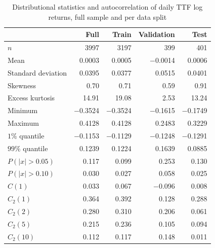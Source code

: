 \begin{table}[H]
\centering
\begin{tabular}{lrrrr}
\toprule
 & Full & Train & Validation & Test \\
\midrule
$n$                    & \num{3997}  & \num{3197}  & \num{399}      & \num{401}    \\
Mean                   &  \num{0.0003}  &  \num{0.0005}  & \num{-0.0014} &  \num{0.0006}  \\
Standard deviation     &  \num{0.0395}  &  \num{0.0377}  &  \num{0.0515}  &  \num{0.0401}  \\
Skewness               &  \num{0.70}    &  \num{0.71}    &  \num{0.59}    &  \num{0.91}    \\
Excess kurtosis        &  \num{14.91}    &  \num{19.08}    &  \num{2.53}    &  \num{13.24}    \\
Minimum                &  \num{-0.3524} &  \num{-0.3524} &  \num{-0.1615} &  \num{-0.1749} \\
Maximum                &  \num{0.4128}  &  \num{0.4128}  &  \num{0.2483}  &  \num{0.3229}  \\
$1\%$ quantile         &  \num{-0.1153} &  \num{-0.1129} &  \num{-0.1248} &  \num{-0.1291} \\
$99\%$ quantile        &  \num{0.1239}  &  \num{0.1224}  &  \num{0.1639}  &  \num{0.0885}  \\
$P(|x| > 0.05)$        &  \num{0.117}   &  \num{0.099}   &  \num{0.253}   &  \num{0.130}   \\
$P(|x| > 0.10)$        &  \num{0.030}   &  \num{0.027}   &  \num{0.058}   &  \num{0.025}   \\
\midrule
$C(1)$                 &  \num{0.033}   &  \num{0.067}   &  \num{-0.096} &  \num{0.008}   \\
$C_2(1)$               &  \num{0.364}   &  \num{0.392}   &  \num{0.128}   &  \num{0.288}   \\
$C_2(2)$               &  \num{0.280}   &  \num{0.310}   &  \num{0.206}   &  \num{0.061}   \\
$C_2(5)$               &  \num{0.215}   &  \num{0.236}   &  \num{0.105}   &  \num{0.094}   \\
$C_2(10)$              &  \num{0.112}   &  \num{0.117}   &  \num{0.148}   &  \num{0.011}   \\
\bottomrule
\end{tabular}
\caption[TTF log returns, full sample and per data split]{Distributional statistics and autocorrelation of daily TTF log returns, full sample and per data split}
\label{tab:ttf-stats}
\end{table}

